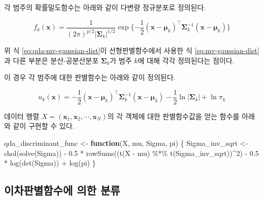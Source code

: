 \documentclass[
]{book}
\newenvironment{Shaded}{\begin{snugshade}}{\end{snugshade}}
\newcommand{\ControlFlowTok}[1]{\textcolor[rgb]{0.13,0.29,0.53}{\textbf{#1}}}
\newcommand{\DecValTok}[1]{\textcolor[rgb]{0.00,0.00,0.81}{#1}}
\newcommand{\FloatTok}[1]{\textcolor[rgb]{0.00,0.00,0.81}{#1}}
\newcommand{\FunctionTok}[1]{\textcolor[rgb]{0.00,0.00,0.00}{#1}}
\newcommand{\NormalTok}[1]{#1}
\newcommand{\OtherTok}[1]{\textcolor[rgb]{0.56,0.35,0.01}{#1}}
\newcommand{\SpecialCharTok}[1]{\textcolor[rgb]{0.00,0.00,0.00}{#1}}
\begin{document}
각 범주의 확률밀도함수는 아래와 같이 다변량 정규분포로 정의된다.

\begin{equation}
f_k(\mathbf{x}) = \frac{1}{(2\pi)^{p/2}|\boldsymbol\Sigma_k|^{1/2}} \exp \{ -\frac{1}{2} \left(\mathbf{x} - \boldsymbol\mu_k\right)^\top \boldsymbol\Sigma_k^{-1} \left(\mathbf{x} - \boldsymbol\mu_k\right) \}
\label{eq:qda-mv-gaussian-dist}
\end{equation}

위 식 \eqref{eq:qda-mv-gaussian-dist}이 선형판별함수에서 사용한 식 \eqref{eq:mv-gaussian-dist}과 다른 부분은 분산-공분산분포 \(\boldsymbol\Sigma_k\)가 범주 \(k\)에 대해 각각 정의된다는 점이다.

이 경우 각 범주에 대한 판별함수는 아래와 같이 정의된다.

\begin{equation}
u_k(\mathbf{x}) = - \frac{1}{2} (\mathbf{x} - \boldsymbol\mu_k)^\top \boldsymbol\Sigma_k^{-1} (\mathbf{x} - \boldsymbol\mu_k) - \frac{1}{2} \ln \left| \boldsymbol\Sigma_k \right| + \ln \pi_k
\label{eq:qda-discriminant-function}
\end{equation}

데이터 행렬 \(X = (\mathbf{x}_1, \mathbf{x}_2, \cdots , \mathbf{x}_N)\)의 각 객체에 대한 판별함수값을 얻는 함수를 아래와 같이 구현할 수 있다.

\begin{Shaded}
\begin{Highlighting}[]
\NormalTok{qda\_discriminant\_func }\OtherTok{\textless{}{-}} \ControlFlowTok{function}\NormalTok{(X, mu, Sigma, pi) \{}
\NormalTok{  Sigma\_inv\_sqrt }\OtherTok{\textless{}{-}} \FunctionTok{chol}\NormalTok{(}\FunctionTok{solve}\NormalTok{(Sigma))}
  \SpecialCharTok{{-}} \FloatTok{0.5} \SpecialCharTok{*} \FunctionTok{rowSums}\NormalTok{((}\FunctionTok{t}\NormalTok{(X }\SpecialCharTok{{-}}\NormalTok{ mu) }\SpecialCharTok{\%*\%} \FunctionTok{t}\NormalTok{(Sigma\_inv\_sqrt))}\SpecialCharTok{\^{}}\DecValTok{2}\NormalTok{) }\SpecialCharTok{{-}} \FloatTok{0.5} \SpecialCharTok{*} \FunctionTok{log}\NormalTok{(}\FunctionTok{det}\NormalTok{(Sigma)) }\SpecialCharTok{+} \FunctionTok{log}\NormalTok{(pi)}
\NormalTok{\}}
\end{Highlighting}
\end{Shaded}

\hypertarget{qda-discriminant-rule}{%
\subsection{이차판별함수에 의한 분류}\label{qda-discriminant-rule}}
\end{document}
